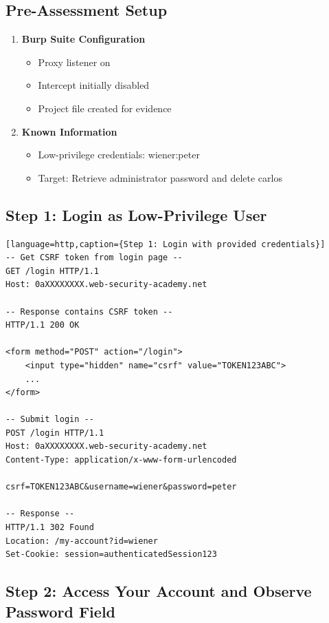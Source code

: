\documentclass[11pt,letterpaper]{article}
\newcommand{\code}[1]{\texttt{\detokenize{#1}}}
\begin{document}
\subsection{Pre-Assessment Setup}

\begin{enumerate}
  \item \textbf{Burp Suite Configuration}
  \begin{itemize}
    \item Proxy listener on \code{127.0.0.1:8080}
    \item Intercept initially disabled
    \item Project file created for evidence
  \end{itemize}

  \item \textbf{Known Information}
  \begin{itemize}
    \item Low-privilege credentials: wiener:peter
    \item Target: Retrieve administrator password and delete carlos
  \end{itemize}
\end{enumerate}

\subsection{Step 1: Login as Low-Privilege User}

\begin{verbatim}[language=http,caption={Step 1: Login with provided credentials}]
-- Get CSRF token from login page --
GET /login HTTP/1.1
Host: 0aXXXXXXXX.web-security-academy.net

-- Response contains CSRF token --
HTTP/1.1 200 OK

<form method="POST" action="/login">
    <input type="hidden" name="csrf" value="TOKEN123ABC">
    ...
</form>

-- Submit login --
POST /login HTTP/1.1
Host: 0aXXXXXXXX.web-security-academy.net
Content-Type: application/x-www-form-urlencoded

csrf=TOKEN123ABC&username=wiener&password=peter

-- Response --
HTTP/1.1 302 Found
Location: /my-account?id=wiener
Set-Cookie: session=authenticatedSession123
\end{verbatim}

\subsection{Step 2: Access Your Account and Observe Password Field}
\end{document}
